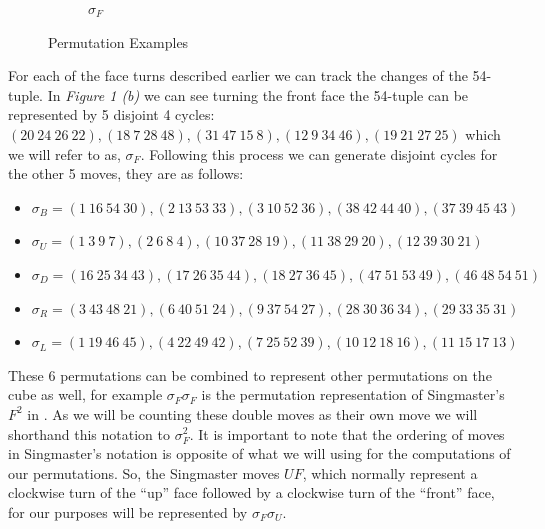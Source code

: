 \documentclass{article}
\begin{document}
\begin{figure}[ht]
\begin{subfigure}[b]{0.5\textwidth}
        \caption{$\sigma_F$}
        \label{fig:clockwise front turn}
    \end{subfigure}
    \caption{Permutation Examples}
    \label{fig:three graphs}
\end{figure}
For each of the face turns described earlier we can track the changes of the 54-tuple.  In \textit{Figure 1 (b)} we can see turning the front face the 54-tuple can be represented by 5 disjoint 4 cycles: $(20\ 24\ 26\ 22), (18\ 7\ 28\ 48), (31\ 47\ 15\ 8), (12\ 9\ 34\ 46), (19\ 21\ 27\ 25)$ which we will refer to as, $\sigma_F$.  Following this process we can generate disjoint cycles for the other 5 moves, they are as follows:
\begin{itemize}
    \item $\sigma_B = (1\ 16\ 54\ 30), (2\ 13\ 53\ 33), (3\ 10\ 52\ 36), (38\ 42\ 44\ 40), (37\ 39\ 45\ 43)$
    \item $\sigma_U = (1\ 3\ 9\ 7), (2\ 6\ 8\ 4), (10\ 37\ 28\ 19), (11\ 38\ 29\ 20), (12\ 39\ 30\ 21)$
    \item $\sigma_D = (16\ 25\ 34\ 43), (17\ 26\ 35\ 44), (18\ 27\ 36\ 45), (47\ 51\ 53\ 49), (46\ 48\ 54\ 51)$
    \item $\sigma_R = (3\ 43\ 48\ 21), (6\ 40\ 51\ 24), (9\ 37\ 54\ 27), (28\ 30\ 36\ 34), (29\ 33\ 35\ 31)$
    \item $\sigma_L = (1\ 19\ 46\ 45), (4\ 22\ 49\ 42), (7\ 25\ 52\ 39), (10\ 12\ 18\ 16), (11\ 15\ 17\ 13)$
\end{itemize}
These 6 permutations can be combined to represent other permutations on the cube as well, for example $\sigma_F\sigma_F$ is the permutation representation of Singmaster's $F^2$ in .  As we will be counting these double moves as their own move we will shorthand this notation to $\sigma_F^2$.  It is important to note that the ordering of moves in Singmaster's notation is opposite of what we will using for the computations of our permutations.  So, the Singmaster moves $UF$, which normally represent a clockwise turn of the ``up'' face followed by a clockwise turn of the ``front'' face, for our purposes will be represented by $\sigma_F \sigma_U$.
\end{document}

